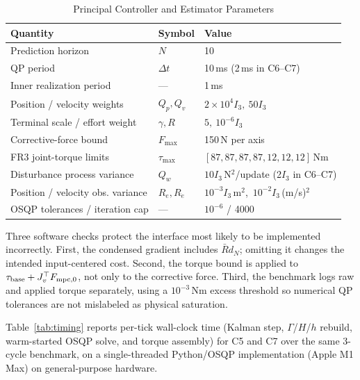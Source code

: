 \documentclass[conference]{IEEEtran}
\begin{document}
\begin{table}[t]
\caption{Principal Controller and Estimator Parameters}
\label{tab:params}
\centering
\footnotesize
\setlength{\tabcolsep}{3.0pt}
\begin{tabular}{@{}lll@{}}
\toprule
Quantity & Symbol & Value\\
\midrule
Prediction horizon & $N$ & 10\\
QP period & $\Delta t$ & 10\,ms (2\,ms in C6--C7)\\
Inner realization period & --- & 1\,ms\\
Position / velocity weights & $Q_p,Q_v$ & $2\!\times\!10^4 I_3,\ 50I_3$\\
Terminal scale / effort weight & $\gamma,R$ & $5,\ 10^{-6}I_3$\\
Corrective-force bound & $F_{\max}$ & 150\,N per axis\\
FR3 joint-torque limits & $\tau_{\max}$ & $[87,87,87,87,12,12,12]$\,Nm\\
Disturbance process variance & $Q_w$ & $10I_3\,$N$^2$/update (2$I_3$ in C6--C7)\\
Position / velocity obs. variance & $R_e,R_{\dot e}$ & $10^{-3}I_3\,$m$^2$,\ $10^{-2}I_3\,$(m/s)$^2$\\
OSQP tolerances / iteration cap & --- & $10^{-6}$ / 4000\\
\bottomrule
\end{tabular}
\end{table}

Three software checks protect the interface most likely to be implemented
incorrectly. First, the condensed gradient includes $\bar R d_N$; omitting it
changes the intended input-centered cost. Second, the torque bound is applied
to $\tau_{\rm base}+J_v^\top F_{\mathrm{mpc},0}$, not only to the corrective
force. Third, the benchmark logs raw and applied torque separately, using a
$10^{-3}$\,Nm excess threshold so numerical QP tolerances are not mislabeled as
physical saturation.

Table~\ref{tab:timing} reports per-tick wall-clock time (Kalman step,
$\Gamma$/$H$/$h$ rebuild, warm-started OSQP solve, and torque assembly) for
C5 and C7 over the same 3-cycle benchmark, on a single-threaded Python/OSQP
implementation (Apple M1 Max) on general-purpose hardware.
\end{document}
